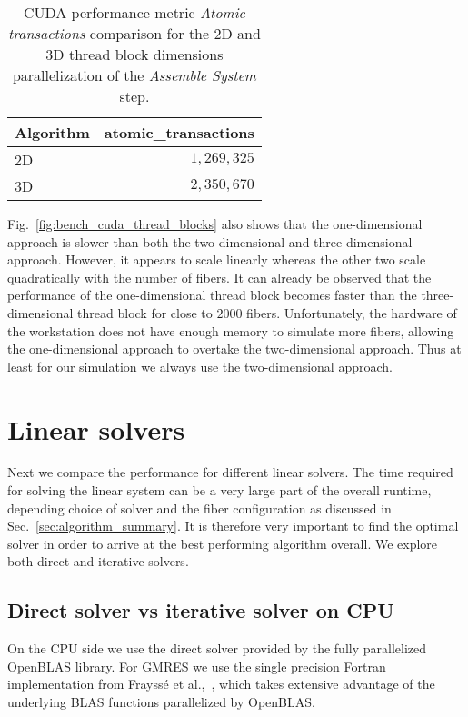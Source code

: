 \begin{table}[!htbp]
  \begin{center}
    \begin{tabulary}{0.7\textwidth}{LR}
      \toprule
      Algorithm & atomic\_transactions \\
      \midrule
      2D & $1,269,325$ \\
      3D & $2,350,670$ \\
      \bottomrule
    \end{tabulary}
  \end{center}
  \caption[Atomic transactions of 2D vs. 3D thread block dimensions.]{CUDA performance metric \emph{Atomic transactions} comparison for the 2D and 3D thread block dimensions parallelization of the \emph{Assemble System} step.}
  \label{tab:atomic_transactions}
\end{table}

Fig.~\ref{fig:bench_cuda_thread_blocks} also shows that the one-dimensional approach is slower than both the two-dimensional and three-dimensional approach. However, it appears to scale linearly whereas the other two scale quadratically with the number of fibers. It can already be observed that the performance of the one-dimensional thread block becomes faster than the three-dimensional thread block for close to $2000$ fibers. Unfortunately, the hardware of the workstation does not have enough memory to simulate more fibers, allowing the one-dimensional approach to overtake the two-dimensional approach. Thus at least for our simulation we always use the two-dimensional approach.

\section{Linear solvers}
\label{sec:bench_linear_solvers}

Next we compare the performance for different linear solvers. The time required for solving the linear system can be a very large part of the overall runtime, depending choice of solver and the fiber configuration as discussed in Sec.~\ref{sec:algorithm_summary}. It is therefore very important to find the optimal solver in order to arrive at the best performing algorithm overall. We explore both direct and iterative solvers.

\subsection{Direct solver vs iterative solver on CPU}
On the CPU side we use the direct solver provided by the fully parallelized OpenBLAS library. For GMRES we use the single precision Fortran implementation from Frayssé et al.,~\cite{Fraysse2003}, which takes extensive advantage of the underlying BLAS functions parallelized by OpenBLAS. 

